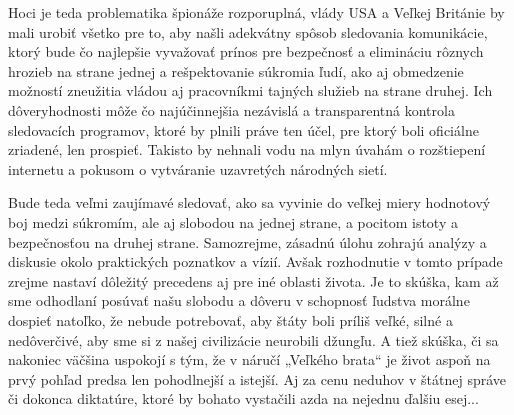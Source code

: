 \documentclass{article}
\begin{document}
Hoci je teda problematika špionáže rozporuplná, vlády USA a Veľkej Británie by mali urobiť všetko pre to, aby našli adekvátny spôsob sledovania komunikácie, ktorý bude čo najlepšie vyvažovať prínos pre bezpečnosť a elimináciu rôznych hrozieb na strane jednej a rešpektovanie súkromia ľudí, ako aj obmedzenie možností zneužitia vládou aj pracovníkmi tajných služieb na strane druhej. Ich dôveryhodnosti môže čo najúčinnejšia nezávislá a transparentná kontrola sledovacích programov, ktoré by plnili práve ten účel, pre ktorý boli oficiálne zriadené, len prospieť. Takisto by nehnali vodu na mlyn úvahám o rozštiepení internetu a pokusom o vytváranie uzavretých národných sietí.

Bude teda veľmi zaujímavé sledovať, ako sa vyvinie do veľkej miery hodnotový boj medzi súkromím, ale aj slobodou na jednej strane, a pocitom istoty a bezpečnosťou na druhej strane. Samozrejme, zásadnú úlohu zohrajú analýzy a diskusie okolo praktických poznatkov a vízií. Avšak rozhodnutie v tomto prípade zrejme nastaví dôležitý precedens aj pre iné oblasti života. Je to skúška, kam až sme odhodlaní posúvať našu slobodu a dôveru v schopnosť ľudstva morálne dospieť natoľko, že nebude potrebovať, aby štáty boli príliš veľké, silné a nedôverčivé, aby sme si z našej civilizácie neurobili džungľu. A tiež skúška, či sa nakoniec väčšina uspokojí s tým, že v náručí „Veľkého brata“ je život aspoň na prvý pohľad predsa len pohodlnejší a istejší. Aj za cenu neduhov v štátnej správe či dokonca diktatúre, ktoré by bohato vystačili azda na nejednu ďalšiu esej...

\nocite{cnn1}
\nocite{techsme2}
\nocite{techidnes2}
\nocite{sme4}
\nocite{sme8}

\printbibliography

\end{document}
